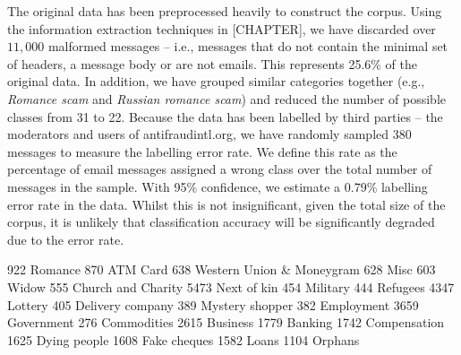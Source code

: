 The original data has been preprocessed heavily to construct the corpus. Using the information extraction techniques in [CHAPTER], we have discarded over $11,000$ malformed messages -- i.e., messages that do not contain the minimal set of headers, a message body or are not emails. This represents 25.6\% of the original data. In addition, we have grouped similar categories together (e.g., \textit{Romance scam} and \textit{Russian romance scam}) and reduced the number of possible classes from 31 to 22. Because the data has been labelled by third parties -- the moderators and users of antifraudintl.org, we have randomly sampled 380 messages to measure the labelling error rate. We define this rate as the percentage of email messages assigned a wrong class over the total number of messages in the sample. With 95\% confidence, we estimate a 0.79\% labelling error rate in the data. Whilst this is not insignificant, given the total size of the corpus, it is unlikely that classification accuracy will be significantly degraded due to the error rate. 

922		Romance
870		ATM Card
638		Western Union \& Moneygram
628		Misc
603		Widow
555		Church and Charity
5473	Next of kin
454		Military
444		Refugees
4347	Lottery
405		Delivery company
389		Mystery shopper
382		Employment
3659	Government
276		Commodities
2615	Business
1779	Banking
1742	Compensation
1625	Dying people
1608	Fake cheques
1582	Loans
1104	Orphans


